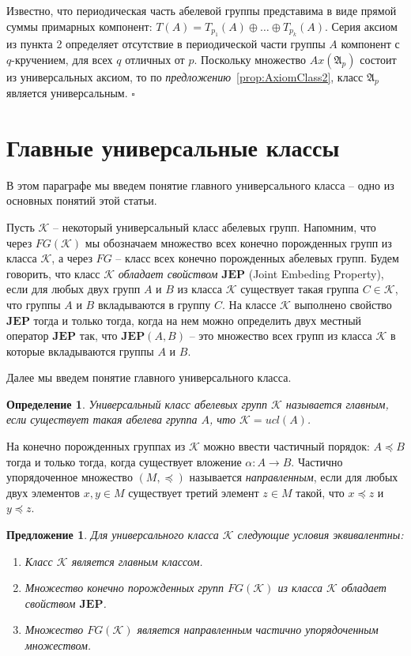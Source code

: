 \documentclass[a4paper,11pt,twoside]{article}
\newtheorem{proposition}{Предложение}[section]
\newtheorem{definition}{Определение}[section]
\def\A{{\mathfrak{A}}}
\def\K{{\mathcal{K}}}
\def\JEP{{\textbf{JEP}}}
\begin{document}
Известно, что периодическая часть абелевой группы представима в виде прямой суммы примарных компонент: $T(A) = T_{p_1}(A) \oplus \ldots \oplus T_{p_k}(A)$. Серия аксиом из пункта 2 определяет отсутствие в периодической части группы $A$ компонент с $q$-кручением, для всех $q$ отличных от $p$. Поскольку множество $Ax(\A_p)$ состоит из универсальных аксиом, то по \textit{предложению}~\ref{prop:AxiomClass2}, класс $\A_p$ является универсальным.
$\square$




\section{Главные универсальные классы}\label{sec:MainClasses}

В этом параграфе мы введем понятие главного универсального класса -- одно из основных понятий этой статьи.

Пусть $\K$ -- некоторый универсальный класс абелевых групп. Напомним, что через $FG(\K)$ мы обозначаем множество всех конечно порожденных групп из класса $\K$, а через $FG$ -- класс всех конечно порожденных абелевых групп. Будем говорить, что класс $\K$ \textit{обладает свойством} $\JEP$ (Joint Embeding Property), если для любых двух групп $A$ и $B$ из класса $\K$ существует такая группа $C \in \K$, что группы $A$ и $B$ вкладываются в группу $C$. На классе $\K$ выполнено свойство $\JEP$ тогда и только тогда, когда на нем можно определить двух местный оператор $\JEP$ так, что $\JEP(A, B)$ -- это множество всех групп из класса $\K$ в которые вкладываются группы $A$ и $B$.

Далее мы введем понятие главного универсального класса.

\begin{definition}\label{def:MainClass}
Универсальный класс абелевых групп $\K$ называется главным, если существует такая абелева группа $A$, что $\K = ucl(A)$.
\end{definition}

На конечно порожденных группах из $\K$ можно ввести частичный порядок: $A \preceq B$ тогда и только тогда, когда существует вложение $\alpha: A \rightarrow B$. Частично упорядоченное множество $(M, \preceq)$ называется \textit{направленным}, если для любых двух элементов $x, y \in M$ существует третий элемент $z \in M$ такой, что $x \preceq z$ и $y \preceq z$. 


\begin{proposition}
Для универсального класса $\K$ следующие условия эквивалентны:
\begin{enumerate}
\item Класс $\K$ является главным классом.
\item Множество конечно порожденных групп $FG(\K)$ из класса $\K$ обладает свойством $\JEP$.
\item Множество $FG(\K)$ является направленным частично упорядоченным множеством.
\end{enumerate}
\end{proposition}
\end{document}
